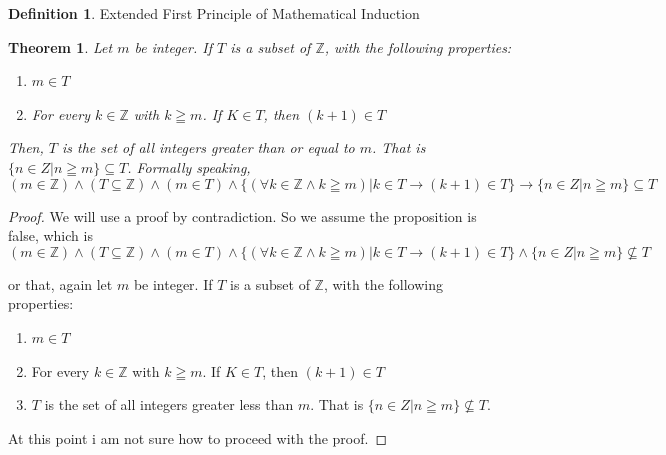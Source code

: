 \documentclass{book}
\newtheorem{theorem}{Theorem}[section]
\theoremstyle{definition}
\newtheorem{definition}{Definition}[section]
\theoremstyle{remark}
\newcommand{\bb}[1]{\mathbb{#1}}
\begin{document}
\begin{definition}
Extended First Principle of Mathematical Induction \\

\begin{tcolorbox}
    \begin{theorem}
        Let $m$ be integer. If $T$ is a subset of $\bb{Z}$, with the following properties: 
            \begin{enumerate}
                \item $m \in T$
                \item For every $k \in \bb{Z}$ with $k \geqq m$. If $K \in T$, then $(k+1) \in T$
            \end{enumerate}
        Then, $T$ is the set of all integers greater than or equal to $m$. That is $\{n \in Z | n \geqq m \} \subseteq T$. Formally speaking,
            \begin{equation}
                (m \in \bb{Z}) \wedge (T \subseteq \bb{Z}) \wedge(m \in T) \wedge \{(\forall k \in \bb{Z} \wedge k \geqq m) | k \in T \to (k+1) \in T \} \to \{n \in Z | n \geqq m \} \subseteq T
            \end{equation}
    \end{theorem}
\end{tcolorbox}

\begin{proof}
    We will use a proof by contradiction. So we assume the proposition is false, which is
        \begin{equation*}
            (m \in \bb{Z}) \wedge (T \subseteq \bb{Z}) \wedge(m \in T) \wedge \{(\forall k \in \bb{Z} \wedge k \geqq m) | k \in T \to (k+1) \in T \} \wedge \{n \in Z | n \geqq m \} \nsubseteq T
        \end{equation*}
    
    or that, again let $m$ be integer. If $T$ is a subset of $\bb{Z}$, with the following properties: 
        \begin{enumerate}
            \item $m \in T$
            \item For every $k \in \bb{Z}$ with $k \geqq m$. If $K \in T$, then $(k+1) \in T$
            \item $T$ is the set of all integers greater less than $m$. That is $\{n \in Z | n \geqq m \} \nsubseteq T$.
        \end{enumerate}
    At this point i am not sure how to proceed with the proof. 
   
\end{proof}
\end{definition}
\end{document}
